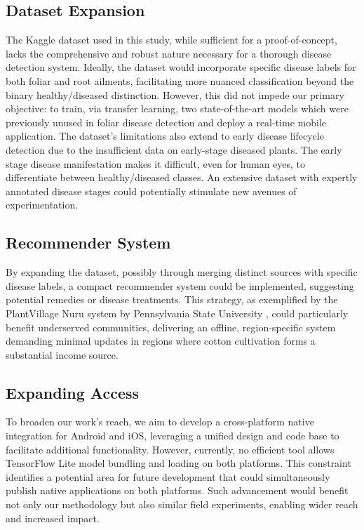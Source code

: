 \documentclass[conference]{IEEEtran}
\begin{document}
\subsection{Dataset Expansion}

The Kaggle dataset used in this study, while sufficient for a proof-of-concept, lacks the comprehensive and robust nature necessary for a thorough disease detection system. Ideally, the dataset would incorporate specific disease labels for both foliar and root ailments, facilitating more nuanced classification beyond the binary healthy/diseased distinction. However, this did not impede our primary objective: to train, via transfer learning, two state-of-the-art models which were previously unused in foliar disease detection and deploy a real-time mobile application. The dataset's limitations also extend to early disease lifecycle detection due to the insufficient data on early-stage diseased plants. The early stage disease manifestation makes it difficult, even for human eyes, to differentiate between healthy/diseased classes. An extensive dataset with expertly annotated disease stages could potentially stimulate new avenues of experimentation.

\subsection{Recommender System}

By expanding the dataset, possibly through merging distinct sources with specific disease labels, a compact recommender system could be implemented, suggesting potential remedies or disease treatments. This strategy, as exemplified by the PlantVillage Nuru system by Pennsylvania State University \cite{PlantVillage}, could particularly benefit underserved communities, delivering an offline, region-specific system demanding minimal updates in regions where cotton cultivation forms a substantial income source.

\subsection{Expanding Access}
To broaden our work's reach, we aim to develop a cross-platform native integration for Android and iOS, leveraging a unified design and code base to facilitate additional functionality. However, currently, no efficient tool allows TensorFlow Lite model bundling and loading on both platforms. This constraint identifies a potential area for future development that could simultaneously publish native applications on both platforms. Such advancement would benefit not only our methodology but also similar field experiments, enabling wider reach and increased impact.
\end{document}
